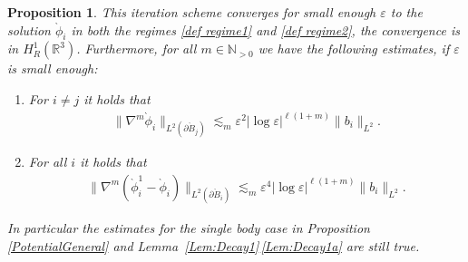 \documentclass[JEP,XML,SOM,Unicode,published]{cedram}
\let\epsilon\varepsilon
\newtheorem{proposition}[theorem]{Proposition}
\theoremstyle{definition}
\newcommand\R{\mathbb{R}}
\newcommand\N{\mathbb{N}}
\newcommand\anorm[1]{\lVert #1\rVert}
\newcommand\bnorm[1]{\bigl\lVert #1\bigr\rVert}
\let\de\partial
\let\eps\epsilon
\begin{document}
\begin{proposition}\label{MultiplePotentials}
This iteration scheme converges for small enough $\eps$ to the solution $\grave{\phi}_i$ in both the regimes \eqref{def regime1} and \eqref{def regime2}, the convergence is in $H_R^1(\R^3)$. Furthermore, for all $m\in \N_{>0}$ we have the following estimates, if $\eps$ is small enough:
\begin{enumerate}
\item\label{MultiplePotentialsa}
For $i\neq j$ it holds that
\begin{align*}
\bnorm{\nabla^m\grave{\phi}_i}_{L^2(\de \grave{B}_j)}\lesssim_m \eps^{2}|{\log\eps}|^{\ell(1+m)}\anorm{b_i}_{L^2}.
\end{align*}

\item\label{MultiplePotentialsb}
For all $i$ it holds that
\begin{align*}
\bnorm{\nabla^m(\grave{\phi}_i^1-\grave{\phi}_i)}_{L^2(\de \grave{B}_i)}\lesssim_m\eps^{4}|{\log\eps}|^{\ell(1+m)} \anorm{b_i}_{L^2}.
\end{align*}
\end{enumerate}
In particular the estimates for the single body case in Proposition \ref{PotentialGeneral} and Lem\-ma~\ref{Lem:Decay1}\,\eqref{Lem:Decay1a} are still true.
\end{proposition}
\end{document}
